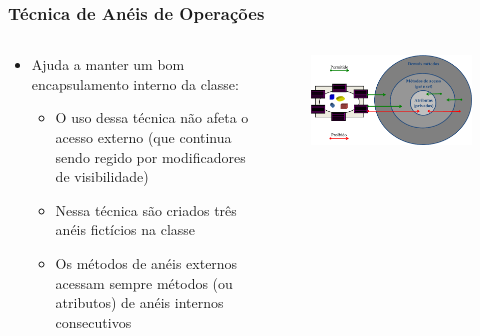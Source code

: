 \documentclass[aspectratio=169]{beamer}
\begin{document}
\begin{frame}\frametitle{Técnica de Anéis de Operações}
\begin{columns}
\begin{column}{0.4\linewidth}
\begin{itemize}
	\item Ajuda a manter um bom encapsulamento interno da classe:
	\begin{itemize}
		\item O uso dessa técnica não afeta o acesso externo (que continua sendo regido por modificadores de visibilidade)
		\item Nessa técnica são criados três anéis fictícios na classe
		\item Os métodos de anéis externos acessam sempre métodos (ou atributos) de anéis internos consecutivos
	\end{itemize}
\end{itemize}
\end{column}
\begin{column}{0.6\linewidth}
\begin{figure}[h]
	\centering
	\includegraphics[height=0.5\paperheight]{imagens/aneis.png}
\end{figure}
\end{column}
\end{columns}
\end{frame}
\end{document}
